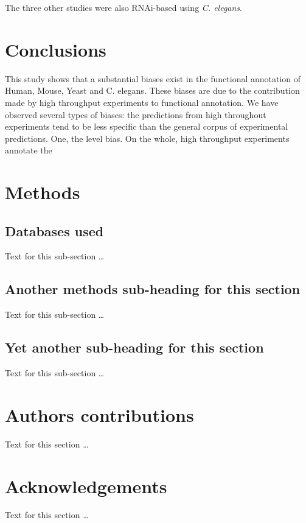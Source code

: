 \documentclass[10pt]{bmc_article}
\newenvironment{bmcformat}{\begin{raggedright}\baselineskip20pt\sloppy\setboolean{publ}{false}}{\end{raggedright}\baselineskip20pt\sloppy}
\begin{document}
\begin{bmcformat}
The three other studies were also RNAi-based using \textit{C. elegans}. 





\section*{Conclusions}
This study shows that a substantial biases exist in the functional annotation of Human, Mouse,
Yeast and C. elegans. These biases are due to the contribution made by high
throughput experiments to functional annotation. We have observed several types of biases: the predictions from
high throughout experiments tend to be less specific than the general corpus of experimental predictions. 
One, the level bias. On the whole, high throughput experiments annotate the 


  
\section*{Methods}
  \subsection*{Databases used}
    Text for this sub-section \ldots

  \subsection*{Another methods sub-heading for this section}
    Text for this sub-section \ldots

  \subsection*{Yet another sub-heading for this section}
    Text for this sub-section \ldots


    
\section*{Authors contributions}
    Text for this section \ldots

    

\section*{Acknowledgements}
  Text for this section \ldots



\end{bmcformat}
\end{document}
